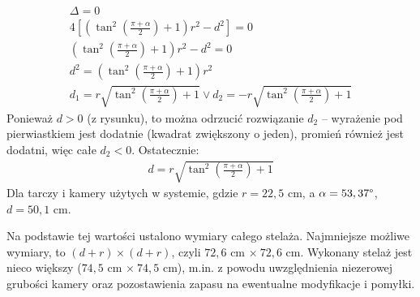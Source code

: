 \begin{gather*}
\Delta = 0 \\
4[(\tan^2(\frac{\pi + \alpha}{2}) + 1)r^2 - d^2] = 0 \\
(\tan^2(\frac{\pi + \alpha}{2}) + 1)r^2 - d^2 = 0 \\
d^2 = (\tan^2(\frac{\pi + \alpha}{2}) + 1)r^2 \\
d_1 = r\sqrt{\tan^2(\frac{\pi + \alpha}{2}) + 1} \lor d_2 = - r\sqrt{\tan^2(\frac{\pi + \alpha}{2}) + 1}
\end{gather*}
Ponieważ $d > 0$ (z rysunku), to można odrzucić rozwiązanie $d_2$ -- wyrażenie pod pierwiastkiem jest dodatnie (kwadrat zwiększony o jeden), promień również jest dodatni, więc całe $d_2 < 0$. Ostatecznie:
\begin{gather*}
d = r\sqrt{\tan^2(\frac{\pi + \alpha}{2}) + 1}
\end{gather*}
Dla tarczy i kamery użytych w systemie, gdzie $r = 22,5$ cm, a $\alpha = 53,37\degree$, $d = 50,1$ cm.

Na podstawie tej wartości ustalono wymiary całego stelaża. Najmniejsze możliwe wymiary, to $(d + r) \times (d + r)$, czyli $72,6$ cm $\times \ 72,6$ cm. Wykonany stelaż jest nieco większy ($74,5$ cm $\times \ 74,5$ cm), m.in. z powodu uwzględnienia niezerowej grubości kamery oraz pozostawienia zapasu na ewentualne modyfikacje i pomyłki.

\begin{gather*}
\end{gather*}
